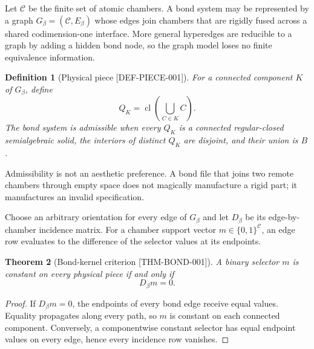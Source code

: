 \documentclass[11pt,openany]{book}
\newcommand{\cl}{\operatorname{cl}}
\newcommand{\claimid}[1]{\textnormal{\sffamily\footnotesize[#1]}}
\theoremstyle{polyplain}
\newtheorem{theorem}{Theorem}[chapter]
\theoremstyle{polydef}
\newtheorem{definition}[theorem]{Definition}
\begin{document}
Let $\mathcal C$ be the finite set of atomic chambers. A bond system may be represented by a graph $G_\beta=(\mathcal C,E_\beta)$ whose edges join chambers that are rigidly fused across a shared codimension-one interface. More general hyperedges are reducible to a graph by adding a hidden bond node, so the graph model loses no finite equivalence information.

\begin{definition}[Physical piece \claimid{DEF-PIECE-001}]
\label{def:physical-piece}
For a connected component $K$ of $G_\beta$, define
\[
Q_K=\cl\left(\bigcup_{C\in K}C\right).
\]
The bond system is \emph{admissible} when every $Q_K$ is a connected regular-closed semialgebraic solid, the interiors of distinct $Q_K$ are disjoint, and their union is $B$.
\end{definition}

Admissibility is not an aesthetic preference. A bond file that joins two remote chambers through empty space does not magically manufacture a rigid part; it manufactures an invalid specification.

Choose an arbitrary orientation for every edge of $G_\beta$ and let $D_\beta$ be its edge-by-chamber incidence matrix. For a chamber support vector $m\in\{0,1\}^{\mathcal C}$, an edge row evaluates to the difference of the selector values at its endpoints.

\begin{theorem}[Bond-kernel criterion \claimid{THM-BOND-001}]
\label{thm:bond-kernel}
A binary selector $m$ is constant on every physical piece if and only if
\[
D_\beta m=0.
\]
\end{theorem}

\begin{proof}
If $D_\beta m=0$, the endpoints of every bond edge receive equal values. Equality propagates along every path, so $m$ is constant on each connected component. Conversely, a componentwise constant selector has equal endpoint values on every edge, hence every incidence row vanishes.
\end{proof}
\end{document}
